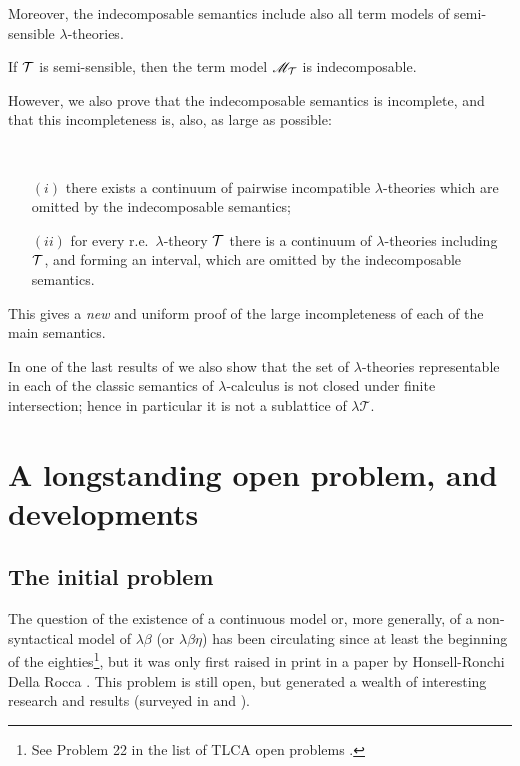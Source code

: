 \documentclass[english]{llncs}
\newcommand{\sqle}{\sqsubseteq}
\newcommand{\lm}[1]{\mathscr{#1}} \newcommand{\Lint}[1]{\Lbrack #1\Rbrack} \newcommand{\ca}[1]{\mathscr{#1}} \newcommand{\Int}[1]{\vert #1\vert}
\newcommand{\LLT}{\lambda\mathscr{T}}\newcommand{\Th}[1]{\mathrm{Th}(#1)} \newcommand{\Thle}[1]{\mathrm{Th_{\sqle}}(#1)} \newcommand{\BTth}{\mathcal{B}}
\newcommand{\cT}{{\cal T}}
\begin{document}
Moreover, the indecomposable semantics include also all term models of semi-sensible $\lambda$-theories.

\begin{theorem}\cite[Thm.~4.4.7]{ManzonettoTh} If $\cT$ is semi-sensible, then the term model $\lm{M}_\cT$ is indecomposable.
\end{theorem}

However, we also prove that the indecomposable semantics is incomplete, and that this incompleteness is, also, as large as possible: 
\begin{theorem} \cite[Thm.~4.4.16, Thm.~4.4.14]{ManzonettoTh} \
\begin{itemize}
\item[$(i)$] there exists a continuum of pairwise incompatible $\lambda$-theories which are omitted by the indecomposable semantics;
\item [$(ii)$] for every r.e.\ $\lambda$-theory $\cT$ there is a continuum of $\lambda$-theories 
               including $\cT$, and forming an interval, which are omitted by the indecomposable semantics. 
\end{itemize}
\end{theorem}

This gives a \emph{new} and uniform proof of the large incompleteness of each of the main semantics.

In one of the last results of \cite[Chapter~4]{ManzonettoTh} we also show that the set of $\lambda$-theories 
representable in each of the classic semantics of $\lambda$-calculus is not closed under 
finite intersection; hence in particular it is not a sublattice of $\LLT$.





\section{A longstanding open problem, and developments}\label{sec:A longstanding open problem, and developments}

\subsection{The initial problem}

The question of the existence of a continuous model or, more generally, of a non-syntactical model of $\lambda\beta$ (or $\lambda\beta\eta$) 
has been circulating since at least the beginning of the eighties\footnote{See Problem 22 in the list of TLCA open problems \cite{HonsellTLCA}.}, 
but it was only first raised in print in a paper by Honsell-Ronchi Della Rocca \cite{HonsellR92}.
This problem is still open, but generated a wealth of interesting research and results (surveyed in \cite{Berline00} and \cite{Berline06}). 
\end{document}
